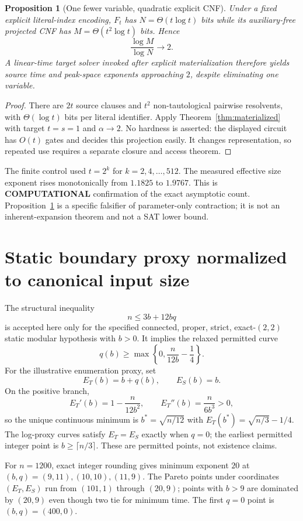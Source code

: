 \documentclass[11pt]{article}
\newtheorem{proposition}[theorem]{Proposition}
\begin{document}
\begin{proposition}[One fewer variable, quadratic explicit CNF]
\label{prop:selector}
Under a fixed explicit literal-index encoding, $F_t$ has
$N=\Theta(t\log t)$ bits while its auxiliary-free projected CNF has
$M=\Theta(t^2\log t)$ bits.  Hence
\[
 \frac{\log M}{\log N}\longrightarrow 2.
\]
A linear-time target solver invoked after explicit materialization therefore yields source time and
peak-space exponents approaching $2$, despite eliminating one variable.
\end{proposition}

\begin{proof}
There are $2t$ source clauses and $t^2$ non-tautological pairwise resolvents, with $\Theta(\log t)$
bits per literal identifier.  Apply Theorem~\ref{thm:materialized} with target $t=s=1$ and
$\alpha\to2$.  No hardness is asserted: the displayed circuit has $O(t)$ gates and decides this
projection easily.  It changes representation, so repeated use requires a separate closure and
access theorem.
\end{proof}

The finite control used $t=2^k$ for $k=2,4,\ldots,512$.  The measured effective size exponent rises
monotonically from $1.1825$ to $1.9767$.  This is \textbf{COMPUTATIONAL} confirmation of the exact
asymptotic count.  Proposition~\ref{prop:selector} is a specific falsifier of parameter-only
contraction; it is not an inherent-expansion theorem and not a SAT lower bound.

\section{Static boundary proxy normalized to canonical input size}

The structural inequality
\[
 n\leq 3b+12bq
\]
is accepted here only for the specified connected, proper, strict, exact-$(2,2)$ static modular
hypothesis with $b>0$.  It implies the relaxed permitted curve
\[
 q(b)\geq\max\left\{0,\frac{n}{12b}-\frac14\right\}.
\]
For the illustrative enumeration proxy, set
\[
 E_T(b)=b+q(b),\qquad E_S(b)=b.
\]
On the positive branch,
\[
 E_T'(b)=1-\frac{n}{12b^2},\qquad
 E_T''(b)=\frac{n}{6b^3}>0,
\]
so the unique continuous minimum is $b^*=\sqrt{n/12}$ with
$E_T(b^*)=\sqrt{n/3}-1/4$.  The log-proxy curves satisfy $E_T=E_S$ exactly when $q=0$; the earliest
permitted integer point is $b\geq\lceil n/3\rceil$.  These are permitted points, not existence claims.

For $n=1200$, exact integer rounding gives minimum exponent $20$ at $(b,q)=(9,11),(10,10),(11,9)$.
The Pareto points under coordinates $(E_T,E_S)$ run from $(101,1)$ through $(20,9)$; points with
$b>9$ are dominated by $(20,9)$ even though two tie for minimum time.  The first $q=0$ point is
$(b,q)=(400,0)$.
\end{document}

